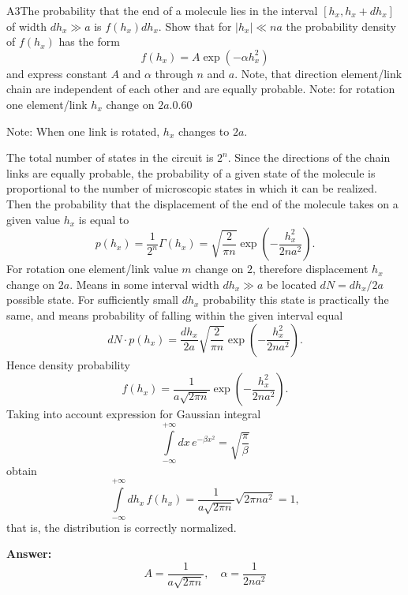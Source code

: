 \documentclass[11pt,a4paper]{article}
\begin{document}
\begin{solcard}{A3}{The probability that the end of a molecule lies in the interval $[h_x, h_x + d h_x]$ of width $dh_x \gg a$ is $f(h_x) dh_x$. Show that for $|h_x| \ll na$ the probability density of $f(h_x)$ has the form $$ f(h_x) = A \exp(-\alpha h_x^2) $$ and express constant $A$ and $\alpha$ through $n$ and $a$. Note, that direction element/link chain are independent of each other and are equally probable. Note: for rotation one element/link $h_x$ change on $2a$.}{0.60}

Note: When one link is rotated, $h_x$ changes to $2a$.


The total number of states in the circuit is $2^n$. Since the directions of the chain links are equally probable, the probability of a given state of the molecule is proportional to the number of microscopic states in which it can be realized. Then the probability that the displacement of the end of the molecule takes on a given value $h_x$ is equal to $$ p(h_x) = \frac{1}{2^n} \Gamma(h_x) = \sqrt{\frac{2}{\pi n}}\exp\left( - \frac{h_x^2}{2n a^2}\right). $$For rotation one element/link value $m$ change on $2$, therefore displacement $h_x$ change on $2 a$. Means in some interval width $dh_x \gg a$ be located $dN = dh_x/2a$ possible state. For sufficiently small $dh_x$ probability this state is practically the same, and means probability of falling within the given interval equal $$ dN \cdot p(h_x) = \frac{dh_x}{2 a} \sqrt{\frac{2}{\pi n}}\exp\left( - \frac{h_x^2}{2n a^2}\right). $$Hence density probability $$ f(h_x) = \frac{1}{a \sqrt{2 \pi n }}\exp\left( - \frac{h_x^2}{2n a^2}\right). $$Taking into account expression for Gaussian integral $$ \int\limits_{-\infty}^{+\infty} dx\, e^{- \beta x^2} = \sqrt{\frac{\pi}{\beta}} $$obtain $$ \int\limits_{-\infty}^{+\infty} dh_x\, f(h_x) =  \frac{1}{a \sqrt{2 \pi n }} \sqrt{2\pi n a^2} = 1, $$that is, the distribution is correctly normalized.

\par\smallskip\noindent\textbf{Answer:} $$ A = \frac{1}{a \sqrt{2 \pi n}}, \quad \alpha = \frac{1}{2 n a^2} $$
\end{solcard}
\end{document}
